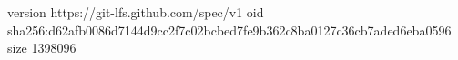 version https://git-lfs.github.com/spec/v1
oid sha256:d62afb0086d7144d9cc2f7c02bcbed7fe9b362c8ba0127c36cb7aded6eba0596
size 1398096
